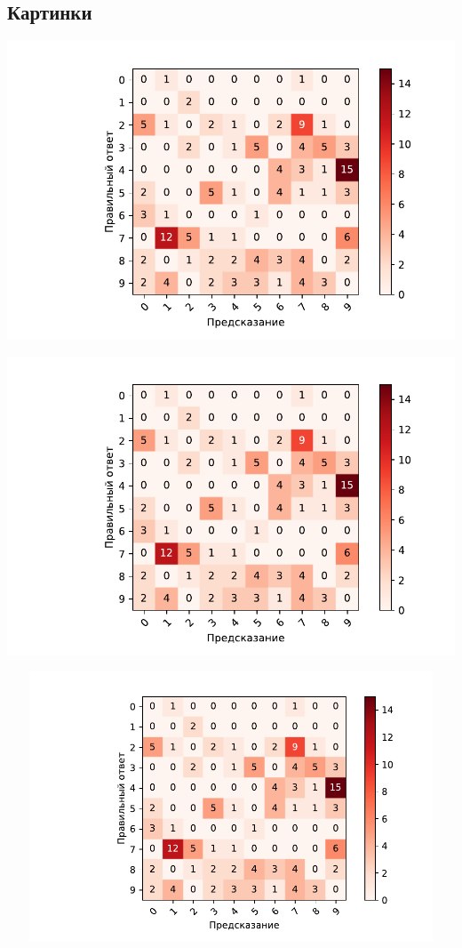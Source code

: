 \documentclass[a4paper, 12pt]{article}
\begin{document}
\subsection{Картинки}
\includegraphics{../conf_matrix_experiment_5_with_full_aug_on_train.pdf}

\includegraphics[scale=0.5]{../conf_matrix_experiment_5_with_full_aug_on_train.pdf}

\includegraphics[width=15cm, height=8cm, keepaspectratio]{../conf_matrix_experiment_5_with_full_aug_on_train.pdf}
\end{document}
